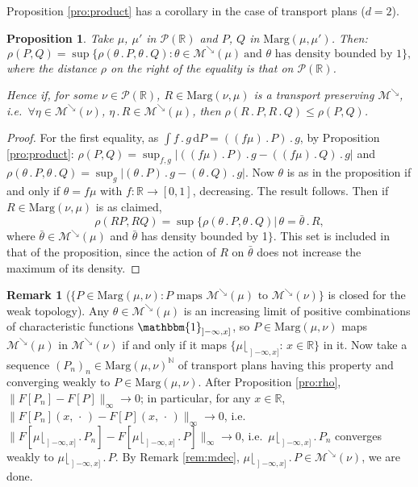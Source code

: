 \documentclass[10pt,a4paper]{article}
\providecommand{\ie}{i.e.\ }
\newcommand{\ldot}{\mathbin{.}}
\theoremstyle{plain}
\newtheorem{pro}[them]{Proposition}
\theoremstyle{definition}
\newtheorem{rem}[them]{Remark}
\newcommand{\dd}{\mathrm{d}}
\newcommand{\one}{\mathbbm{1}}
\newcommand{\p}{\mathcal{P}}
\newcommand{\ma}{\mathrm{Marg}}
\newcommand{\R}{\mathbb{R}}
\newcommand{\N}{\mathbb{N}}
\newcommand{\mdec}{\mathcal{M}^{\scriptscriptstyle\searrow}}
\newcommand{\op}{\mathopen}
\begin{document}
Proposition \ref{pro:product} has a corollary in the case of transport plans ($d=2$).
\begin{pro}\label{pro:multiplicationcontractante}Take $\mu$, $\mu'$ in $\p(\R)$ and $P$, $Q$ in $\ma(\mu,\mu')$. Then:
\[\rho(P,Q)=\sup\{\rho(\theta\ldot P, \theta \ldot Q):\theta\in\mdec(\mu)\ \text{and $\theta$ has density bounded by $1$}\},\]
where the distance $\rho$ on the right of the equality is that on $\p(\R)$.

Hence if, for some $\nu\in \p(\R)$, $R\in\ma(\nu,\mu)$ is a transport preserving $\mdec$, \ie $\forall\eta\in\mdec(\nu)$, $\eta\ldot R\in\mdec(\mu)$, then $\rho(R\ldot P,R\ldot Q)\leqslant\rho(P,Q)$.
\end{pro}

\begin{proof}
For the first equality, as $\int f\ldot g\, \dd P=((f\mu)\ldot P)\ldot g$, by Proposition \ref{pro:product}: $\rho(P,Q)=\sup_{f,g} |((f\mu)\ldot P)\ldot g-((f\mu)\ldot Q)\ldot g|$ and $\rho(\theta\ldot P, \theta \ldot Q)=\sup_g |(\theta\ldot P)\ldot g-(\theta\ldot Q)\ldot g|$. Now $\theta$ is as in the proposition if and only if $\theta=f\mu$ with $f:\R\to[0,1]$, decreasing. The result follows. Then if $R\in\ma(\nu,\mu)$ is as claimed,
\[
\rho(RP,RQ)=\sup\{\rho(\theta\ldot P, \theta \ldot Q)|\,\theta=\bar\theta\ldot R,
\]
where $\bar\theta\in\mdec(\mu)$ and $\bar\theta$ has density bounded by 1$\}$. This set is included in that of the proposition, since the action of $R$ on $\bar\theta$ does not increase the maximum of its density.
\end{proof}

\begin{rem}[$\{P\in\ma(\mu,\nu):P\text{ maps } \mdec(\mu)\text{ to }\mdec(\nu)\}$ is closed for the weak topology]\label{rem:preserver_mdec_ferme}
Any $\theta\in\mdec(\mu)$ is an increasing limit of positive combinations of characteristic functions $\one_{\op]-\infty,x]}$, so $P\in\ma(\mu,\nu)$ maps $\mdec(\mu)$ in $\mdec(\nu)$ if and only if it maps $\{\mu\lfloor_{\op]-\infty,x]}:\,x\in\R\}$ in it. Now take a sequence $(P_n)_n\in\ma(\mu,\nu)^\N$ of transport plans having this property and converging weakly to $P\in\ma(\mu,\nu)$. After Proposition \ref{pro:rho}, $\|F[P_n]-F[P]\|_\infty\to0$; in particular, for any $x\in\R$, $\|F[P_n](x,\,\cdot\,)-F[P](x,\,\cdot\,)\|_\infty\to0$, \ie $\|F[\mu\lfloor_{\op]-\infty,x]}{}\ldot P_n]-F[\mu\lfloor_{\op]-\infty,x]}{}\ldot P]\|_\infty\to0$, \ie $\mu\lfloor_{\op]-\infty,x]}{}\ldot P_n$ converges weakly to $\mu\lfloor_{\op]-\infty,x]}{}\ldot P$. By Remark \ref{rem:mdec}, $\mu\lfloor_{\op]-\infty,x]}{}\ldot P\in\mdec(\nu)$, we are done.
\end{rem}
\end{document}
